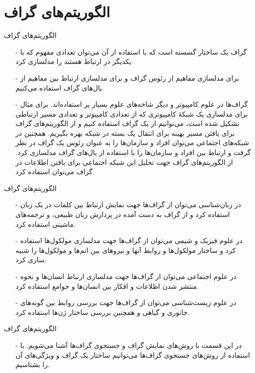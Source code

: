\section{الگوریتم‌های گراف}

\begin{frame}{‌الگوریتم‌های گراف}
\begin{itemize}\itemr
\item[-]
گراف یک ساختار گسسته است که با استفاده از آن می‌توان تعدادی مفهوم که با یکدیگر در ارتباط هستند را مدلسازی کرد.
\item[-]
برای مدلسازی مفاهیم از رئوس گراف و برای مدلسازی ارتباط بین مفاهیم از یال‌های گراف استفاده می‌کنیم.
\item[-]
گراف‌ها در علوم کامپیوتر و دیگر شاخه‌های علوم بسیار پر استفاده‌اند. برای مثال برای مدلسازی یک شبکهٔ کامپیوتری که از تعدادی کامپیوتر و تعدادی مسیر ارتباطی تشکیل شده است، می‌توانیم از یک گراف استفاده کنیم و از الگوریتم‌های گراف برای یافتن مسیر بهینه برای انتقال یک بسته در شبکه بهره بگیریم. همچنین در شبکه‌های اجتماعی می‌توان افراد و سازمان‌ها را به عنوان رئوس یک گراف در نظر گرفت و ارتباط بین افراد و سازمان‌ها را با استفاده از یال‌های گراف مدلسازی کرد. از الگوریتم‌های گراف جهت تحلیل این شبکه اجتماعی برای یافتن اطلاعات در گراف می‌توان استفاده کرد.
\end{itemize}
\end{frame}


\begin{frame}{‌الگوریتم‌های گراف}
\begin{itemize}\itemr
\item[-]
در زبان‌شناسی می‌توان از گراف‌ها جهت نمایش ارتباط بین کلمات در یک زبان استفاده کرد و از گراف به دست آمده در پردازش زبان طبیعی، و ترجمه‌های ماشینی استفاده کرد.
\item[-]
در علوم فیزیک و شیمی می‌توان از گراف‌ها جهت مدلسازی مولکول‌ها استفاده کرد و ساختار مولکول‌ها و روابط آنها و نیروهای بین اتم‌ها و مولکول‌ها را شبیه سازی کرد.
\item[-]
در علوم اجتماعی می‌توان از گراف‌ها جهت مدلسازی ارتباط انسان‌ها و نحوه منتشر شدن اطلاعات و افکار بین انسان‌ها و جوامع استفاده کرد.
\item[-]
در علوم زیست‌شناسی می‌توان از گراف‌ها جهت بررسی روابط بین گونه‌های جانوری و گیاهی و همچنین بررسی ساختار ژن‌ها استفاده کرد.
\end{itemize}
\end{frame}


\begin{frame}{‌الگوریتم‌های گراف}
\begin{itemize}\itemr
\item[-]
در این قسمت با روش‌های نمایش گراف و جستجوی گراف‌ها آشنا می‌شویم. با استفاده از روش‌های جستجوی گراف‌ها می‌توانیم ساختار یک گراف و ویژگی‌های آن را بشناسیم.
\end{itemize}
\end{frame}


